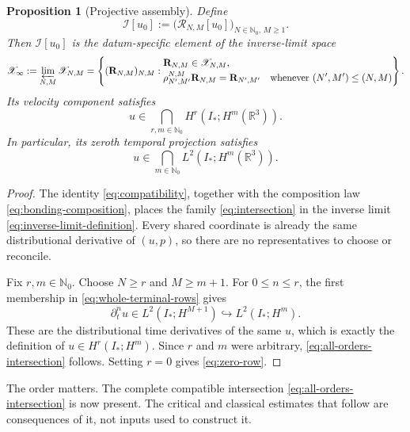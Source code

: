 \documentclass[11pt,letterpaper]{article}
\newtheorem{proposition}[theorem]{Proposition}
\theoremstyle{definition}
\theoremstyle{remark}
\newcommand{\R}{\mathbb R}
\newcommand{\Nzero}{\mathbb N_0}
\newcommand{\cR}{\mathcal R}
\newcommand{\cI}{\mathcal I}
\newcommand{\Istar}{I_*}
\begin{document}
\begin{proposition}[Projective assembly]
\label{prop:projective-assembly}
Define
\begin{equation}
\cI[u_0]
:=\bigl(\cR_{N,M}[u_0]\bigr)_{N\in\Nzero,\,M\ge1}.
\label{eq:intersection}
\end{equation}
Then \(\cI[u_0]\) is the datum-specific element of the inverse-limit space
\begin{equation}
\mathscr X_\infty
:=\varprojlim_{N,M}\mathscr X_{N,M}
=
\left\{
(\mathbf R_{N,M})_{N,M}:
\begin{aligned}
&\mathbf R_{N,M}\in\mathscr X_{N,M},\\[-0.2em]
&\rho_{N',M'}^{N,M}\mathbf R_{N,M}
=\mathbf R_{N',M'}
\quad\text{whenever }(N',M')\le(N,M)
\end{aligned}
\right\}.
\label{eq:inverse-limit-definition}
\end{equation}
Its velocity component satisfies
\begin{equation}
\boxed{
u\in\bigcap_{r,m\in\Nzero}H^r(\Istar;H^m(\R^3)).}
\label{eq:all-orders-intersection}
\end{equation}
In particular, its zeroth temporal projection satisfies
\begin{equation}
u\in\bigcap_{m\in\Nzero}L^2(\Istar;H^m(\R^3)).
\label{eq:zero-row}
\end{equation}
\end{proposition}

\begin{proof}
The identity \eqref{eq:compatibility}, together with the composition law
\eqref{eq:bonding-composition}, places the family
\eqref{eq:intersection} in the inverse limit
\eqref{eq:inverse-limit-definition}.  Every shared coordinate is already
the same distributional derivative of \((u,p)\), so there are no
representatives to choose or reconcile.

Fix \(r,m\in\Nzero\).  Choose \(N\ge r\) and \(M\ge m+1\).  For
\(0\le n\le r\), the first membership in
\eqref{eq:whole-terminal-rows} gives
\[
\partial_t^n u\in L^2(\Istar;H^{M+1})
\hookrightarrow L^2(\Istar;H^m).
\]
These are the distributional time derivatives of the same \(u\), which is
exactly the definition of \(u\in H^r(\Istar;H^m)\).  Since \(r\) and \(m\)
were arbitrary, \eqref{eq:all-orders-intersection} follows.  Setting
\(r=0\) gives \eqref{eq:zero-row}.
\end{proof}

The order matters.  The complete compatible intersection
\eqref{eq:all-orders-intersection} is now present.  The critical and
classical estimates that follow are consequences of it, not inputs used to
construct it.
\end{document}
